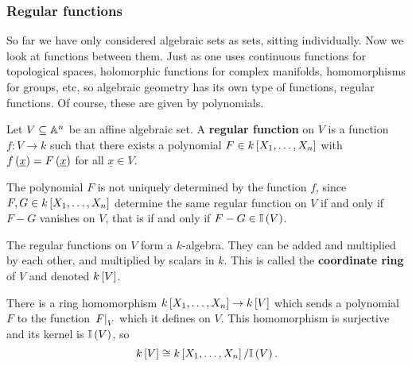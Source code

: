 \subsubsection{Regular functions}


So far we have only considered algebraic sets as sets, sitting individually. Now we look at functions between them. Just as one uses continuous functions for topological spaces, holomorphic functions for complex manifolds, homomorphisms for groups, etc, so algebraic geometry has its own type of functions, regular functions. Of course, these are given by polynomials.

\begin{definition*}
Let $ V \subseteq \AA^n $ be an affine algebraic set. A \textbf{regular function} on $ V $ is a function $ f : V \to k $ such that there exists a polynomial $ F \in k\sbr{X_1, \dots, X_n} $ with $ f\br{\underline{x}} = F\br{\underline{x}} $ for all $ \underline{x} \in V $.
\end{definition*}

\begin{note*}
The polynomial $ F $ is not uniquely determined by the function $ f $, since $ F, G \in k\sbr{X_1, \dots, X_n} $ determine the same regular function on $ V $ if and only if $ F - G $ vanishes on $ V $, that is if and only if $ F - G \in \II\br{V} $.
\end{note*}

\begin{definition*}
The regular functions on $ V $ form a $ k $-algebra. They can be added and multiplied by each other, and multiplied by scalars in $ k $. This is called the \textbf{coordinate ring} of $ V $ and denoted $ k\sbr{V} $.
\end{definition*}

There is a ring homomorphism $ k\sbr{X_1, \dots, X_n} \to k\sbr{V} $ which sends a polynomial $ F $ to the function $ \eval{F}_V $ which it defines on $ V $. This homomorphism is surjective and its kernel is $ \II\br{V} $, so
$$ k\sbr{V} \cong k\sbr{X_1, \dots, X_n} / \II\br{V}. $$

